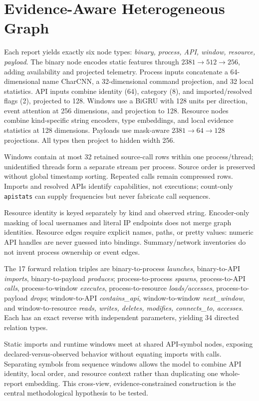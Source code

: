 \documentclass[journal]{IEEEtran}
\begin{document}
\section{Evidence-Aware Heterogeneous Graph}
Each report yields exactly six node types: \emph{binary, process, API,
window, resource, payload}. The binary node encodes static features through
$2381\!\to\!512\!\to\!256$, adding availability and projected telemetry.
Process inputs concatenate a 64-dimensional name CharCNN, a 32-dimensional
command projection, and 32 local statistics. API inputs combine identity
(64), category (8), and imported/resolved flags (2), projected to 128.
Windows use a BiGRU with 128 units per direction,
event attention at 256 dimensions, and projection to 128. Resource nodes
combine kind-specific string encoders, type embeddings, and local evidence
statistics at 128 dimensions. Payloads use mask-aware
$2381\!\to\!64\!\to\!128$ projections. All types then project to hidden
width 256.

Windows contain at most 32 retained source-call rows within one
process/thread; unidentified threads form a separate stream per process.
Source order is preserved without global timestamp sorting. Repeated calls
remain compressed rows. Imports and resolved APIs identify capabilities,
not executions; count-only \texttt{apistats} can supply frequencies but
never fabricate call sequences.

Resource identity is keyed separately by kind and observed string.
Encoder-only masking of local usernames and literal IP endpoints does not
merge graph identities. Resource edges require explicit names, paths, or
pretty values: numeric API handles are never guessed into bindings.
Summary/network inventories do not invent process ownership or event edges.

The 17 forward relation triples are binary-to-process \emph{launches},
binary-to-API \emph{imports}, binary-to-payload \emph{produces};
process-to-process \emph{spawns}, process-to-API \emph{calls},
process-to-window \emph{executes}, process-to-resource \emph{loads/accesses},
process-to-payload \emph{drops}; window-to-API \emph{contains\_api},
window-to-window \emph{next\_window}, and window-to-resource
\emph{reads, writes, deletes, modifies, connects\_to, accesses}.
Each has an exact reverse with independent parameters, yielding 34 directed
relation types.

Static imports and runtime windows meet at shared API-symbol nodes, exposing
declared-versus-observed behavior without equating imports with calls.
Separating symbols from sequence windows allows the model to combine API
identity, local order, and resource context rather than duplicating one
whole-report embedding. This cross-view, evidence-constrained construction
is the central methodological hypothesis to be tested.
\end{document}
